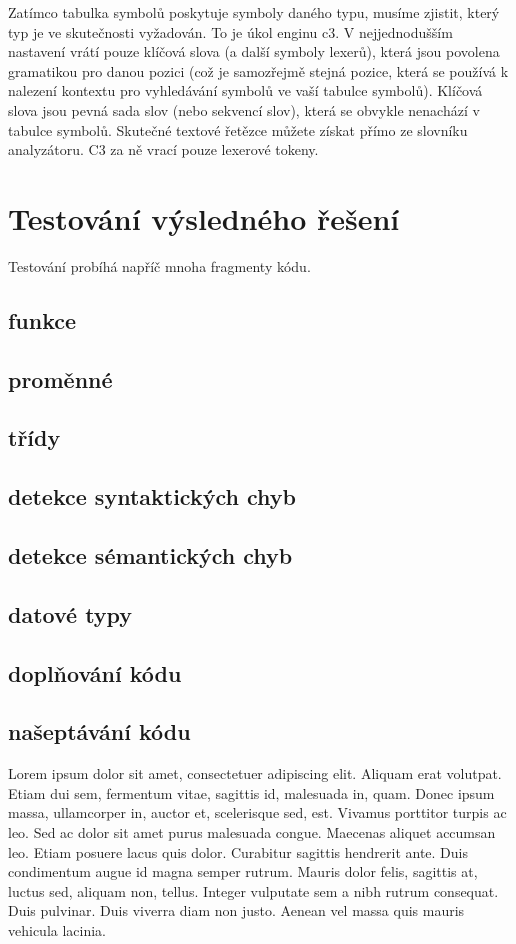 \documentclass[czech,master,dept460,male,cpp,cpdeclaration]{diploma}
\begin{document}
Zatímco tabulka symbolů poskytuje symboly daného typu, musíme zjistit, který typ je ve skutečnosti vyžadován. To je úkol enginu c3. V nejjednodušším nastavení vrátí pouze klíčová slova (a další symboly lexerů), která jsou povolena gramatikou pro danou pozici (což je samozřejmě stejná pozice, která se používá k nalezení kontextu pro vyhledávání symbolů ve vaší tabulce symbolů). Klíčová slova jsou pevná sada slov (nebo sekvencí slov), která se obvykle nenachází v tabulce symbolů. Skutečné textové řetězce můžete získat přímo ze slovníku analyzátoru. C3 za ně vrací pouze lexerové tokeny.


\section{Testování výsledného řešení}
Testování probíhá napříč mnoha fragmenty kódu.
\subsection{funkce}
\subsection{proměnné}
\subsection{třídy}
\subsection{detekce syntaktických chyb}
\subsection{detekce sémantických chyb}
\subsection{datové typy}
\subsection{doplňování kódu}
\subsection{našeptávání kódu}

Lorem ipsum dolor sit amet, consectetuer adipiscing elit. Aliquam erat volutpat. Etiam dui sem, fermentum vitae, sagittis id, malesuada in, quam. Donec ipsum massa, ullamcorper in, auctor et, scelerisque sed, est. Vivamus porttitor turpis ac leo. Sed ac dolor sit amet purus malesuada congue. Maecenas aliquet accumsan leo. Etiam posuere lacus quis dolor. Curabitur sagittis hendrerit ante. Duis condimentum augue id magna semper rutrum. Mauris dolor felis, sagittis at, luctus sed, aliquam non, tellus. Integer vulputate sem a nibh rutrum consequat. Duis pulvinar. Duis viverra diam non justo. Aenean vel massa quis mauris vehicula lacinia.
\end{document}
